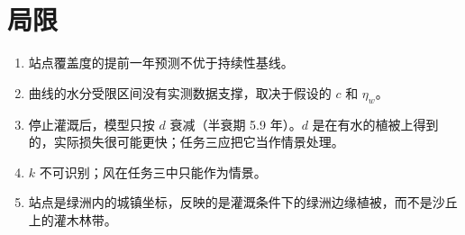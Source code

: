\documentclass[11pt,a4paper]{ctexart}
\begin{document}
\section{局限}
\begin{enumerate}
\item 站点覆盖度的提前一年预测不优于持续性基线。
\item 曲线的水分受限区间没有实测数据支撑，取决于假设的 $c$ 和 $\eta_w$。
\item 停止灌溉后，模型只按 $d$ 衰减（半衰期 5.9 年）。$d$ 是在有水的植被上得到的，实际损失很可能更快；任务三应把它当作情景处理。
\item $k$ 不可识别；风在任务三中只能作为情景。
\item 站点是绿洲内的城镇坐标，反映的是灌溉条件下的绿洲边缘植被，而不是沙丘上的灌木林带。
\end{enumerate}
\end{document}
